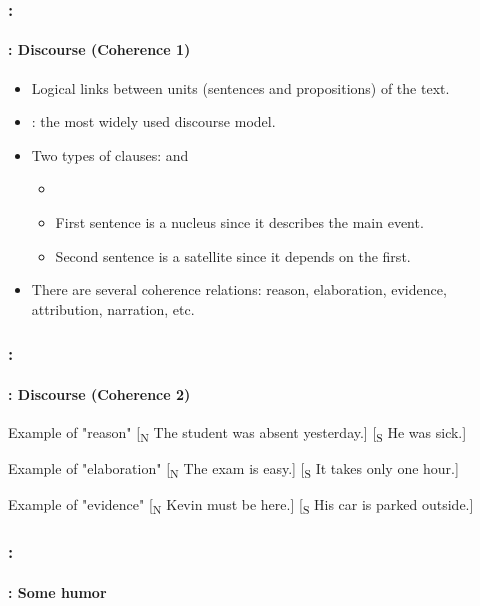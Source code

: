 \documentclass[xcolor=table]{beamer}
\begin{document}
\begin{frame}
	\frametitle{\insertshortsubtitle: \insertsection}
	\framesubtitle{\insertsubsection: Discourse (Coherence 1)}

	\begin{itemize}
		\item Logical links between units (sentences and propositions) of the text.
		\item {}: the most widely used discourse model.
		\item Two types of clauses:  and 
		\begin{itemize}
			\item {}
			\item First sentence is a nucleus since it describes the main event.
			\item Second sentence is a satellite since it depends on the first.
		\end{itemize}
		\item There are several coherence relations: reason, elaboration, evidence, attribution, narration, etc.
	\end{itemize}

\end{frame}

\begin{frame}
	\frametitle{\insertshortsubtitle: \insertsection}
	\framesubtitle{\insertsubsection: Discourse (Coherence 2)}

	\begin{exampleblock}{Example of "reason"}
		[\textsubscript{N} The student was absent yesterday.] [\textsubscript{S} He was sick.]
	\end{exampleblock}
	
	\begin{exampleblock}{Example of "elaboration"}
		[\textsubscript{N} The exam is easy.] [\textsubscript{S} It takes only one hour.]
	\end{exampleblock}
	
	\begin{exampleblock}{Example of "evidence"}
		[\textsubscript{N} Kevin must be here.] [\textsubscript{S} His car is parked outside.]
	\end{exampleblock}

\end{frame}

\begin{frame}
	\frametitle{\insertshortsubtitle: \insertsection}
	\framesubtitle{\insertsubsection: Some humor}

	\begin{center}
	\end{center}

\end{frame}
\end{document}
